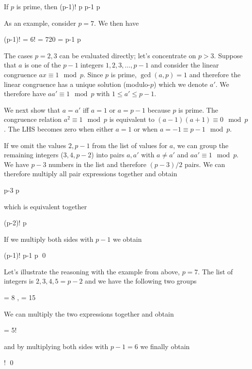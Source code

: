 
\begin{theorem}
    If $p$ is prime, then
    \bee
    (p-1)!  \mod p \equiv p-1 \mod p
    \eee
\end{theorem}

As an example, consider $p = 7$. We then have

\bee
(p-1)! = 6! = 720  = p-1 \mod p
\eee

The cases $p =2, 3$ can be evaluated directly; let's concentrate on $p > 3$. Suppose that $a$ is one of the $p-1$ integers $1,2,3,\ldots, p-1$ and consider the linear congruence $ax \equiv 1 \mod p$. Since $p$ is prime, $\gcd(a,p) = 1$ and therefore the linear congruence has a unique solution (modulo-$p$) which we denote $a'$. We therefore have $a a' \equiv 1 \mod p$ with $1 \leq a' \leq p-1$.

We next show that $a = a'$ iff $a = 1$ or $a = p-1$ because $p$ is prime. The congruence relation $a^2 \equiv 1 \mod p$ is equivalent to $(a-1)(a+1) \equiv 0 \mod p$. The LHS becomes zero when either $a = 1$ or when $a = -1 \equiv p-1 \mod p$.

If we omit the values $2, p-1$ from the list of values for $a$, we can group the remaining integers ($3,4, p-2$) into pairs $a, a'$ with $a \neq a'$ and $a a' \equiv 1 \mod p$. We have $p-3$ numbers in the list and therefore $(p-3)/2$ pairs. We can therefore multiply all pair expressions together and obtain

  \cdots p-3  \mod p
\eee

which is equivalent together

\bee
(p-2)!  \mod p
\eee

If we multiply both sides with $p-1$ we obtain

\bee
(p-1)! \equiv p-1  \mod p \qed
\eee

Let's illustrate the reasoning with the example from above, $p=7$. The list of integers is $2,3,4,5 = p-2$ and we have the following two groups

  = 8  ,   = 15  
\eee

We can multiply the two expressions together and obtain

    = 5!  
\eee

and by multiplying both sides with $p-1=6$ we finally obtain

!   \qed
\eee




